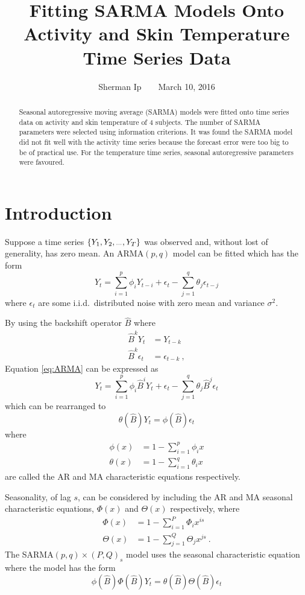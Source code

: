\documentclass[a4paper]{proc}
\title{Fitting SARMA Models Onto Activity and Skin Temperature Time Series Data}
\author{Sherman Ip$\qquad$March 10, 2016}
\newcommand{\dotdotdot}{\vphantom{.}_{\cdots}}
\newcommand{\backshift}{\widehat{B}}
\begin{document}
\maketitle

\begin{abstract}
Seasonal autoregressive moving average (SARMA) models were fitted onto time series data on activity and skin temperature of 4 subjects. The number of SARMA parameters were selected using information criterions. It was found the SARMA model did not fit well with the activity time series because the forecast error were too big to be of practical use. For the temperature time series, seasonal autoregressive parameters were favoured.
\end{abstract}

\section{Introduction}
Suppose a time series $\{Y_1,Y_2,\dotdotdot,Y_T\}$ was observed and, without lost of generality, has zero mean. An ARMA$(p,q)$ model can be fitted which has the form
\begin{equation}
Y_t = \sum_{i=1}^{p} \phi_i Y_{t-i} + \epsilon_t - \sum_{j=1}^{q} \theta_{j} \epsilon_{t-j}
\label{eq:ARMA}
\end{equation}
where $\epsilon_t$ are some i.i.d.~distributed noise with zero mean and variance $\sigma^2$.

By using the backshift operator $\backshift$ where
\begin{align}
\backshift^k Y_t &= Y_{t-k} \\
\backshift^k \epsilon_t &= \epsilon_{t-k} \ ,
\end{align}
Equation \eqref{eq:ARMA} can be expressed as
\begin{equation}
Y_t = \sum_{i=1}^{p} \phi_i \backshift^i Y_{t} + \epsilon_t - \sum_{j=1}^{q} \theta_{j} \backshift^j \epsilon_{t}
\end{equation}
which can be rearranged to
\begin{equation}
\theta\left(\backshift\right)Y_t=\phi\left(\backshift\right)\epsilon_t
\end{equation}
where
\begin{align}
\phi(x)&=1-\sum_{i=1}^{p} \phi_i x \\
\theta(x)&=1-\sum_{i=1}^{q} \theta_i x
\end{align}
are called the AR and MA characteristic equations respectively.

Seasonality, of lag $s$, can be considered by including the AR and MA seasonal characteristic equations, $\Phi(x)$ and $\Theta(x)$ respectively, where
\begin{align}
\Phi(x) &= 1 - \sum_{i=1}^P \Phi_i x^{is} \\
\Theta(x) &= 1 - \sum_{j=1}^Q \Theta_j x^{js} \ .
\end{align}
The SARMA$(p,q)\times(P,Q)_s$ model uses the seasonal characteristic equation where the model has the form
\begin{equation}
\phi\left(\backshift\right)\Phi\left(\backshift\right)Y_t
=
\theta\left(\backshift\right)\Theta\left(\backshift\right)\epsilon_t
\end{equation}
\end{document}
